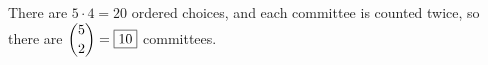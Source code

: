 There are $5\cdot4=20$ ordered choices, and each committee is counted twice, so there are $\dbinom52=\boxed{10}$ committees.
